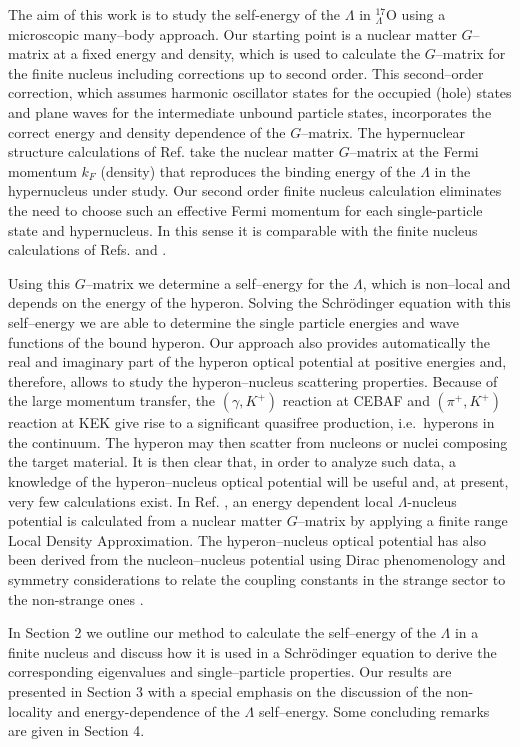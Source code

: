 The aim of this work is to study the self-energy of the $\Lambda$ in
$^{17}_{\Lambda}$O using a microscopic many--body approach. Our starting point
is a nuclear matter $G$--matrix at a fixed
energy and density, which is used to calculate the $G$--matrix for the
finite nucleus including corrections up to second order. This second--order
correction, which assumes harmonic oscillator states for the occupied
(hole) states and plane waves for the intermediate unbound particle
states, incorporates the correct energy and density dependence of the
$G$--matrix.
The hypernuclear structure calculations of Ref.  \cite{yamamoto} take
the nuclear matter $G$--matrix at the Fermi momentum $k_F$ (density) that
reproduces the binding energy of the $\Lambda$ in the hypernucleus
under study.
Our second order finite nucleus calculation eliminates the need to
choose such an effective
Fermi momentum for each single-particle state and
hypernucleus. In this sense it is comparable
with the finite nucleus calculations of Refs.  \cite{kuo} and
 \cite{halderson}.

Using this $G$--matrix we determine a self--energy for the $\Lambda$,
which is non--local and depends on the energy of the hyperon. Solving
the Schr\"{o}dinger equation with this self--energy we are able to 
determine the single particle energies and wave functions of the bound
hyperon. Our approach also provides automatically
the real and imaginary part of the hyperon optical potential
at positive energies and, therefore,
allows to study the hyperon--nucleus scattering properties.
Because of the large momentum transfer, the $(\gamma,K^+)$ reaction at
CEBAF \cite{CEBAF2} and $(\pi^+,K^+)$ reaction at KEK \cite{KEK} give
rise to a significant
quasifree production, i.e.\ hyperons in the continuum. The hyperon may
then scatter from nucleons or nuclei composing the target material. It
is then clear that, in order to analyze such data, a knowledge of the
hyperon--nucleus optical potential will be useful and, at present,
very few calculations exist.
In Ref.  \cite{bando2}, an energy dependent local $\Lambda$-nucleus
potential is calculated from a nuclear matter $G$--matrix by applying a
finite range Local Density Approximation. The hyperon--nucleus optical
potential has also been derived from the nucleon--nucleus potential
using Dirac phenomenology and symmetry considerations to relate the
coupling constants in the strange sector to the non-strange
ones \cite{mares}.



In Section 2 we outline our method to calculate the self--energy of
the $\Lambda$ in a finite nucleus and discuss how it is used
in a Schr\"odinger equation to derive the corresponding eigenvalues
and single--particle properties. Our results are presented in 
Section 3 with a special emphasis on the discussion of the non-locality
and energy-dependence of the $\Lambda$ self--energy.
Some concluding remarks are given in Section 4.

